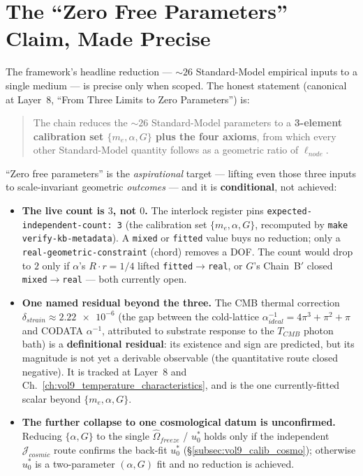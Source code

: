 \section{The ``Zero Free Parameters'' Claim, Made Precise}
\label{sec:vol9_calib_zero_params}

The framework's headline reduction --- $\sim 26$ Standard-Model empirical inputs to a single medium --- is precise only when scoped. The honest statement (canonical at  Layer~8, ``From Three Limits to Zero Parameters'') is:

\begin{quote}
The chain reduces the $\sim 26$ Standard-Model parameters to a \textbf{3-element calibration set $\{m_e, \alpha, G\}$ plus the four axioms}, from which every other Standard-Model quantity follows as a geometric ratio of $\ell_{node}$.
\end{quote}

\noindent ``Zero free parameters'' is the \emph{aspirational} target --- lifting even those three inputs to scale-invariant geometric \emph{outcomes} --- and it is \textbf{conditional}, not achieved:

\begin{itemize}
    \item \textbf{The live count is $3$, not $0$.} The interlock register pins \texttt{expected-independent-count:~3} (the calibration set $\{m_e, \alpha, G\}$, recomputed by \texttt{make verify-kb-metadata}). A \texttt{mixed} or \texttt{fitted} value buys no reduction; only a \texttt{real-geometric-constraint} (chord) removes a DOF. The count would drop to $2$ only if $\alpha$'s $R\cdot r = 1/4$ lifted \texttt{fitted}$\to$\texttt{real}, or $G$'s Chain~B$'$ closed \texttt{mixed}$\to$\texttt{real} --- both currently open.
    \item \textbf{One named residual beyond the three.} The CMB thermal correction $\delta_{strain} \approx \num{2.22e-6}$ (the gap between the cold-lattice $\alpha^{-1}_{ideal} = 4\pi^3 + \pi^2 + \pi$ and CODATA $\alpha^{-1}$, attributed to substrate response to the $T_{CMB}$ photon bath) is a \textbf{definitional residual}: its existence and sign are predicted, but its magnitude is not yet a derivable observable (the quantitative route closed negative). It is tracked at  Layer~8 and Ch.~\ref{ch:vol9_temperature_characteristics}, and is the one currently-fitted scalar beyond $\{m_e, \alpha, G\}$.
    \item \textbf{The further collapse to one cosmological datum is unconfirmed.} Reducing $\{\alpha, G\}$ to the single $\hat{\Omega}_{freeze}$ / $u_0^*$ holds only if the independent $\mathcal{J}_{cosmic}$ route confirms the back-fit $u_0^*$ (\S\ref{subsec:vol9_calib_cosmo}); otherwise $u_0^*$ is a two-parameter $(\alpha, G)$ fit and no reduction is achieved.
\end{itemize}

